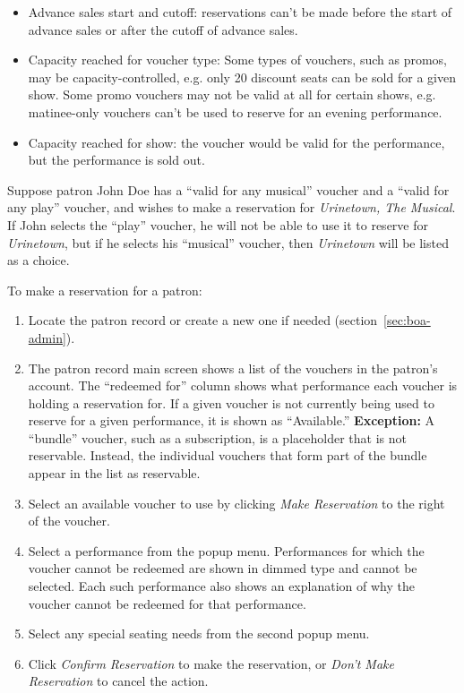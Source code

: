 \begin{itemize}
\item Advance sales start and cutoff: reservations can't be made before
  the start of advance sales or after the cutoff of advance sales.
\item Capacity reached for voucher type: Some types of vouchers, such as
  promos, may be capacity-controlled, e.g. only 20 discount seats can be
  sold for a given show.  Some promo vouchers may not be valid at all
  for certain shows, e.g. matinee-only vouchers can't be used to reserve
  for an evening performance.
\item Capacity reached for show: the voucher would be valid for the
  performance, but the performance is sold out.
\end{itemize}

Suppose patron John Doe has a ``valid for any musical'' voucher and a
``valid for any play'' voucher, and wishes to make a reservation for
\emph{Urinetown, The Musical}.  If John selects the ``play''
voucher, he will not be able to use it to reserve for \emph{Urinetown},
but if he selects his ``musical'' voucher, then \emph{Urinetown} will be
listed as a choice.

To make a reservation for a patron:

\begin{enumerate}
\item Locate the patron record or create a new one if needed
  (section~\ref{sec:boa-admin}). 
\item The patron record main screen shows a list of the vouchers in the
  patron's account.  The ``redeemed for'' column shows what performance
  each voucher is holding a reservation for.  If a given voucher is not
  currently being used to reserve for a given performance, it is shown
  as ``Available.''  \textbf{Exception:} A ``bundle'' voucher, such as a
  subscription, is a placeholder that is not reservable.  Instead, the
  individual vouchers that form part of the bundle appear in the list as
  reservable. 
\item Select an available voucher to use  by  clicking \emph{Make
    Reservation} to the right of the voucher.
\item Select a performance from the popup menu. Performances for which
  the voucher cannot be redeemed are shown in dimmed type and cannot be
  selected.  Each such performance also shows an explanation of why the
  voucher cannot be redeemed for that performance.
\item Select any special seating needs from the second popup menu.
\item Click \emph{Confirm Reservation} to make the reservation, or
  \emph{Don't Make Reservation} to cancel the action.
\end{enumerate}


